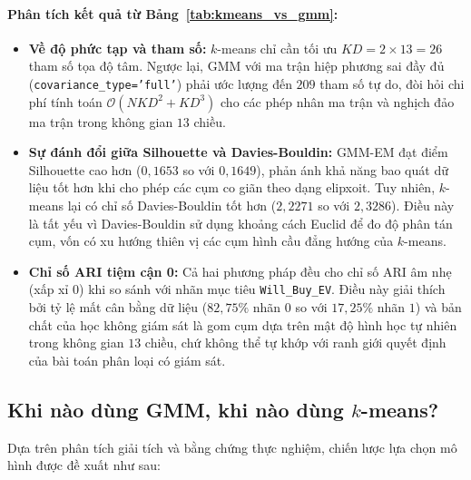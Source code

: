 \paragraph{Phân tích kết quả từ Bảng~\ref{tab:kmeans_vs_gmm}:}
\begin{itemize}
    \item \textbf{Về độ phức tạp và tham số:} $k$-means chỉ cần tối ưu $KD = 2 \times 13 = 26$ tham số tọa độ tâm. Ngược lại, GMM với ma trận hiệp phương sai đầy đủ (\texttt{covariance\_type='full'}) phải ước lượng đến $209$ tham số tự do, đòi hỏi chi phí tính toán $\mathcal{O}(NKD^2 + KD^3)$ cho các phép nhân ma trận và nghịch đảo ma trận trong không gian $13$ chiều.
    \item \textbf{Sự đánh đổi giữa Silhouette và Davies-Bouldin:} GMM-EM đạt điểm Silhouette cao hơn ($0{,}1653$ so với $0{,}1649$), phản ánh khả năng bao quát dữ liệu tốt hơn khi cho phép các cụm co giãn theo dạng elipxoit. Tuy nhiên, $k$-means lại có chỉ số Davies-Bouldin tốt hơn ($2{,}2271$ so với $2{,}3286$). Điều này là tất yếu vì Davies-Bouldin sử dụng khoảng cách Euclid để đo độ phân tán cụm, vốn có xu hướng thiên vị các cụm hình cầu đẳng hướng của $k$-means.
    \item \textbf{Chỉ số ARI tiệm cận 0:} Cả hai phương pháp đều cho chỉ số ARI âm nhẹ (xấp xỉ $0$) khi so sánh với nhãn mục tiêu \texttt{Will\_Buy\_EV}. Điều này giải thích bởi tỷ lệ mất cân bằng dữ liệu ($82{,}75\%$ nhãn $0$ so với $17{,}25\%$ nhãn $1$) và bản chất của học không giám sát là gom cụm dựa trên mật độ hình học tự nhiên trong không gian $13$ chiều, chứ không thể tự khớp với ranh giới quyết định của bài toán phân loại có giám sát.
\end{itemize}

\subsection{Khi nào dùng GMM, khi nào dùng \texorpdfstring{$k$}{k}-means?}

Dựa trên phân tích giải tích và bằng chứng thực nghiệm, chiến lược lựa chọn mô hình được đề xuất như sau:

